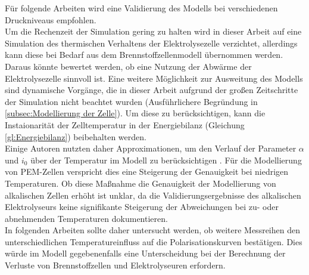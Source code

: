 Für folgende Arbeiten wird eine Validierung des Modells bei verschiedenen Druckniveaus empfohlen.\\

Um die Rechenzeit der Simulation gering zu halten wird in dieser Arbeit auf eine Simulation des thermischen Verhaltens der Elektrolysezelle verzichtet, allerdings kann diese bei Bedarf aus dem Brennstoffzellenmodell übernommen werden. Daraus könnte bewertet werden, ob eine Nutzung der Abwärme der Elektrolysezelle sinnvoll ist.
Eine weitere Möglichkeit zur Ausweitung des Modells sind dynamische Vorgänge, die in dieser Arbeit aufgrund der großen Zeitschritte der Simulation nicht beachtet wurden (Ausführlichere Begründung in \ref{subsec:Modellierung der Zelle}). Um diese zu berücksichtigen, kann die Instaionarität der Zelltemperatur in der Energiebilanz (Gleichung \ref{gl:Energiebilanz}) beibehalten werden.\\

Einige Autoren nutzten daher Approximationen, um den Verlauf der Parameter $\alpha$ und $i_0$ über der Temperatur im Modell zu berücksichtigen . Für die Modellierung von PEM-Zellen verspricht dies eine 
Steigerung der Genauigkeit bei niedrigen Temperaturen. Ob diese Maßnahme die Genauigkeit der Modellierung von alkalischen Zellen erhöht ist unklar, da die Validierungsergebnisse des alkalischen Elektrolyseurs keine signifikante Steigerung der Abweichungen bei zu- oder abnehmenden Temperaturen dokumentieren.\\

In folgenden Arbeiten sollte daher untersucht werden, ob weitere Messreihen den unterschiedlichen Temperatureinfluss auf die Polarisationskurven bestätigen. Dies würde im Modell gegebenenfalls eine Unterscheidung bei der Berechnung der Verluste von Brennstoffzellen und Elektrolyseuren erfordern.\\